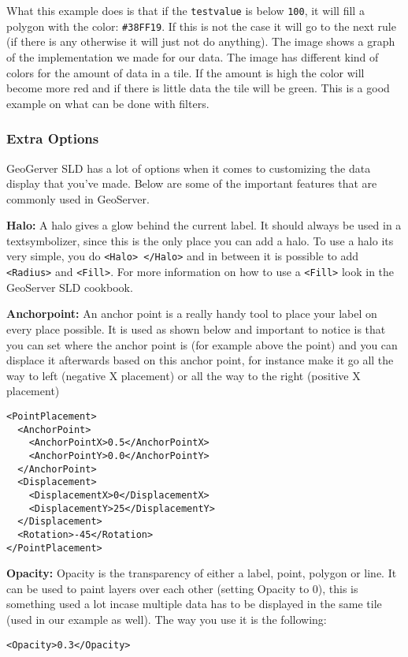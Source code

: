 What this example does is that if the \lstinline|testvalue| is below \lstinline|100|, it will fill a polygon with the color: \lstinline|#38FF19|. If this is not the case it will go to the next rule (if there is any otherwise it will just not do anything). The image shows a graph of the implementation we made for our data. The image has different kind of colors for the amount of data in a tile. If the amount is high the color will become more red and if there is little data the tile will be green. This is a good example on what can be done with filters.

\subsubsection{Extra Options}

GeoGerver SLD has a lot of options when it comes to customizing the data display that you've made. Below are some of the important features that are commonly used in GeoServer.

\textbf{Halo:} A halo gives a glow behind the current label. It should always be used in a textsymbolizer, since this is the only place you can add a halo. To use a halo its very simple, you do \lstinline|<Halo> </Halo>| and in between it is possible to add \lstinline|<Radius>| and \lstinline|<Fill>|. For more information on how to use a \lstinline|<Fill>| look in the GeoServer SLD cookbook.

\textbf{Anchorpoint:} An anchor point is a really handy tool to place your label on every place possible. It is used as shown below and important to notice is that you can set where the anchor point is (for example above the point) and you can displace it afterwards based on this anchor point, for instance make it go all the way to left (negative X placement) or all the way to the right (positive X placement)
\begin{lstlisting}
<PointPlacement>
  <AnchorPoint>
    <AnchorPointX>0.5</AnchorPointX>
    <AnchorPointY>0.0</AnchorPointY>
  </AnchorPoint>
  <Displacement>
    <DisplacementX>0</DisplacementX>
    <DisplacementY>25</DisplacementY>
  </Displacement>
  <Rotation>-45</Rotation>
</PointPlacement>
\end{lstlisting}

\textbf{Opacity:} Opacity is the transparency of either a label, point, polygon or line. It can be used to paint layers over each other (setting Opacity to 0), this is something used a lot incase multiple data has to be displayed in the same tile (used in our example as well). The way you use it is the following:
\begin{lstlisting}
<Opacity>0.3</Opacity>
\end{lstlisting}

